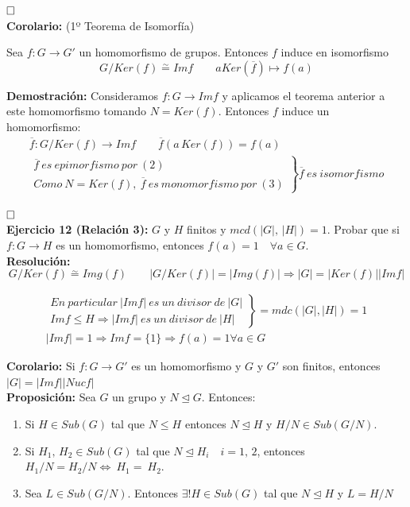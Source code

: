 \documentclass{article}
\begin{document}
$\hfill\square$\\

\textbf{Corolario:} (1º Teorema de Isomorfía)

Sea $f:G\rightarrow G'$ un homomorfismo de grupos. Entonces $f$ induce en isomorfismo
\begin{equation*}
G/Ker(f)\overset{\sim}{=} Imf\qquad aKer(\overline{f})\mapsto f(a)
\end{equation*}

\textbf{Demostración:} Consideramos $f:G\rightarrow Imf$ y aplicamos el teorema anterior a este homomorfismo tomando $N=Ker(f)$. Entonces $f$ induce un homomorfismo:
\begin{gather*}
\overline{f}:G/Ker(f)\rightarrow Imf \qquad \overline{f}(a\,Ker(f))=f(a) \\
\left. \begin{array}{c}
\overline{f}\:es\:epimorfismo\:por\:(2)\\
Como\:N=Ker(f),\:\overline{f}\:es\:monomorfismo\:por\:(3)
\end{array} \right\rbrace 
\overline{f}\:es\:isomorfismo
\end{gather*}

$\hfill\square$\\

\textbf{Ejercicio 12 (Relación 3):} $G$ y $H$ finitos y $mcd(|G|,\,|H|)=1$. Probar que si $f:G\rightarrow H$ es un homomorfismo, entonces $f(a)=1\quad \forall a\in G$. \\

\textbf{Resolución:}
\begin{equation*}
G/Ker(f)\overset{\sim}{=} Img(f) \qquad |G/Ker(f)|=|Img(f)|\Rightarrow |G|=|Ker(f)||Imf|
\end{equation*}

\begin{gather*}
\left. \begin{array}{c}
En\:particular\:|Imf|\:es\:un\:divisor\:de\:|G|\\
Imf\leq H\Rightarrow|Imf|\:es\:un\:divisor\:de\:|H|
\end{array} \right\rbrace = mdc(|G|,|H|)=1 \\
|Imf|=1\Rightarrow Imf=\{1\}\Rightarrow f(a)=1 \forall a \in G
\end{gather*}

\textbf{Corolario:} Si $f:G\rightarrow G'$ es un homomorfismo y $G$ y $G'$ son finitos, entonces $|G|=|Imf||Nucf|$ \\

\textbf{Proposición:} Sea $G$ un grupo y $N\unlhd G$. Entonces:
\begin{enumerate}[(1)]
\item Si $H\in Sub(G)$ tal que $N\leq H$ entonces $N\unlhd H$ y $H/N\in Sub(G/N)$.

\item Si $H_1,\,H_2\in Sub(G)$ tal que $N\unlhd H_i \quad i=1,\,2$, entonces $H_1/N=H_2/N\Leftrightarrow ~H_1=~H_2$.

\item Sea $L\in Sub(G/N)$. Entonces $\exists ! H\in Sub(G)$ tal que $N\unlhd H$ y $L=H/N$
\end{enumerate}
\end{document}
